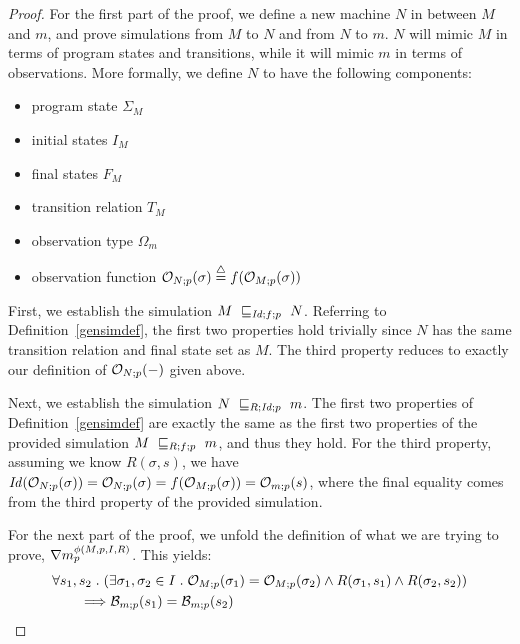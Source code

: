 \begin{proof}
For the first part of the proof, we define a new machine $N$ in between $M$
and $m$, and prove simulations from $M$ to $N$ and from $N$
to $m$. $N$ will mimic $M$ in terms of program states
and transitions, while it will mimic $m$ in terms of observations.
More formally, we define $N$ to have the following components:
\begin{itemize}
\item program state $\Sigma_M$
\item initial states $I_M$
\item final states $F_M$
\item transition relation $T_M$
\item observation type $\Omega_m$
\item observation function 
$\observem{N}{p}{\sigma} \isdef \obsrel{R}(\observem{M}{p}{\sigma})$
\end{itemize}

First, we establish the simulation $\simu{M}{N}{\mathid;\obsrel{R};p}$.
Referring to Definition~\ref{gensimdef}, the first two properties hold
trivially since $N$ has the same transition relation and final
state set as $M$. The third property reduces to exactly our
definition of $\observem{N}{p}{-}$ given above.

Next, we establish the simulation $\simu{N}{m}{R;\mathid;p}$. The
first two properties of Definition~\ref{gensimdef} are exactly
the same as the first two properties of the provided simulation
$\simu{M}{m}{R;\obsrel{R};p}$, and thus they hold. For the third
property, assuming we know $R(\sigma,s)$, we have 
$\mathid(\observem{N}{p}{\sigma}) = 
\observem{N}{p}{\sigma} = \obsrel{R}(\observem{M}{p}{\sigma})
= \observem{m}{p}{s}$, where the final equality comes from
the third property of the provided simulation.

For the next part of the proof, we unfold the definition of
what we are trying to prove, $\bsecure{m}{\phi(M,p,I,R)}{p}$. This
yields: 
\begin{align*}
& \forall s_1, s_2 \such 
(\exists \sigma_1, \sigma_2 \in I \such 
\observem{M}{p}{\sigma_1} = \observem{M}{p}{\sigma_2}
\land R(\sigma_1,s_1) \land R(\sigma_2,s_2)) \\
& \qquad \Longrightarrow 
\behavior{m;p}{s_1} = \behavior{m;p}{s_2}
\end{align*}%


\end{proof}
